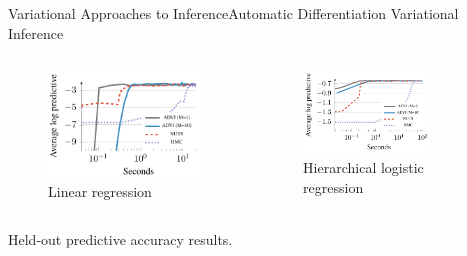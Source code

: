 \documentclass[AERbeamer%
              ,optEnglish%
              ,optBiber%
              ,optBibstyleAlphabetic%
              ,optBeamerClassicFormat%
              ]{AERlatex}%
\begin{document}
\begin{frame}[c]{Variational Approaches to Inference}{Automatic Differentiation Variational Inference}
    \centering
    \begin{columns}[T]
        \begin{column}{0.4\textwidth}
            \begin{figure}
                \centering
                \includegraphics[width=\textwidth]{VIADVILinearRegression.png}
                \caption{Linear regression}
            \end{figure}
        \end{column}
        \begin{column}{0.58\textwidth}
            \begin{figure}
                \centering
                \includegraphics[width=0.75\textwidth]{ViADVIHierarchicalRegression.png}
                \caption{Hierarchical logistic regression}
            \end{figure}
        \end{column}
    \end{columns}
    \vspace{1cm}
    Held-out predictive accuracy results.
\end{frame}
\end{document}
